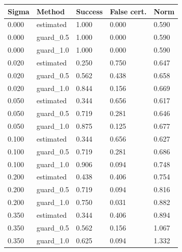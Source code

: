 \begin{tabular}{lllll}
\toprule
Sigma & Method & Success & False cert. & Norm \\
\midrule
0.000 & estimated & 1.000 & 0.000 & 0.590 \\
0.000 & guard\_0.5 & 1.000 & 0.000 & 0.590 \\
0.000 & guard\_1.0 & 1.000 & 0.000 & 0.590 \\
0.020 & estimated & 0.250 & 0.750 & 0.647 \\
0.020 & guard\_0.5 & 0.562 & 0.438 & 0.658 \\
0.020 & guard\_1.0 & 0.844 & 0.156 & 0.669 \\
0.050 & estimated & 0.344 & 0.656 & 0.617 \\
0.050 & guard\_0.5 & 0.719 & 0.281 & 0.646 \\
0.050 & guard\_1.0 & 0.875 & 0.125 & 0.677 \\
0.100 & estimated & 0.344 & 0.656 & 0.627 \\
0.100 & guard\_0.5 & 0.719 & 0.281 & 0.686 \\
0.100 & guard\_1.0 & 0.906 & 0.094 & 0.748 \\
0.200 & estimated & 0.438 & 0.406 & 0.754 \\
0.200 & guard\_0.5 & 0.719 & 0.094 & 0.816 \\
0.200 & guard\_1.0 & 0.750 & 0.031 & 0.882 \\
0.350 & estimated & 0.344 & 0.406 & 0.894 \\
0.350 & guard\_0.5 & 0.562 & 0.156 & 1.067 \\
0.350 & guard\_1.0 & 0.625 & 0.094 & 1.332 \\
\bottomrule
\end{tabular}
